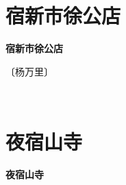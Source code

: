 \documentclass[12pt,UTF-8,openany,fontset=none]{ctexbook}
\begin{document}
\vspace{8pt}
\clearpage


\section{宿新市徐公店}



\begin{center}
    {\bfseries 宿新市徐公店}
\end{center}

\begin{center}
    \vspace{10pt}
    
    \begin{large}
        
        〔杨万里〕
        
    \end{large}
    
    \vspace{8pt}
    
    \begin{huge}
        
        \phantom{。}~~

        \phantom{。}
        
        \phantom{。}

        \phantom{。}
        
    \end{huge}
    
\end{center}

\vspace{8pt}
\clearpage


\section{夜宿山寺}



\begin{center}
    {\bfseries 夜宿山寺}
\end{center}
\end{document}
